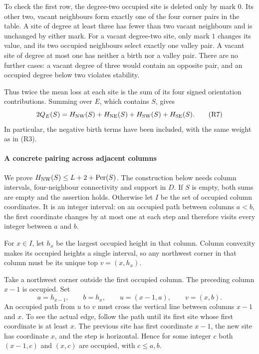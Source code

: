 \documentclass[
  11pt,
  a4paper,
]{article}
\begin{document}
To check the first row, the degree-two occupied site is deleted only by
mark \(0\). Its other two, vacant neighbours form exactly one of the
four corner pairs in the table. A site of degree at least three has
fewer than two vacant neighbours and is unchanged by either mark. For a
vacant degree-two site, only mark \(1\) changes its value, and its two
occupied neighbours select exactly one valley pair. A vacant site of
degree at most one has neither a birth nor a valley pair. There are no
further cases: a vacant degree of three would contain an opposite pair,
and an occupied degree below two violates stability.

Thus twice the mean loss at each site is the sum of its four signed
orientation contributions. Summing over \(E\), which contains \(S\),
gives \[
2Q_E(S)=H_{\rm NW}(S)+H_{\rm NE}(S)+H_{\rm SW}(S)+H_{\rm SE}(S).
\tag{R7}
\] In particular, the negative birth terms have been included, with the
same weight as in (R3).

\paragraph{A concrete pairing across adjacent
columns}\label{a-concrete-pairing-across-adjacent-columns}

We prove \(H_{\rm NW}(S)\leq L+2+\operatorname{Per}(S)\). The
construction below needs column intervals, four-neighbour connectivity
and support in \(D\). If \(S\) is empty, both sums are empty and the
assertion holds. Otherwise let \(I\) be the set of occupied column
coordinates. It is an integer interval: on an occupied path between
columns \(a<b\), the first coordinate changes by at most one at each
step and therefore visits every integer between \(a\) and \(b\).

For \(x\in I\), let \(h_x\) be the largest occupied height in that
column. Column convexity makes its occupied heights a single interval,
so any northwest corner in that column must be its unique top
\(v=(x,h_x)\).

Take a northwest corner outside the first occupied column. The preceding
column \(x-1\) is occupied. Set \[
a=h_{x-1},\qquad b=h_x,\qquad
u=(x-1,a),\qquad v=(x,b).
\] An occupied path from \(u\) to \(v\) must cross the vertical line
between columns \(x-1\) and \(x\). To see the actual edge, follow the
path until its first site whose first coordinate is at least \(x\). The
previous site has first coordinate \(x-1\), the new site has coordinate
\(x\), and the step is horizontal. Hence for some integer \(c\) both
\((x-1,c)\) and \((x,c)\) are occupied, with \(c\leq a,b\).
\end{document}
